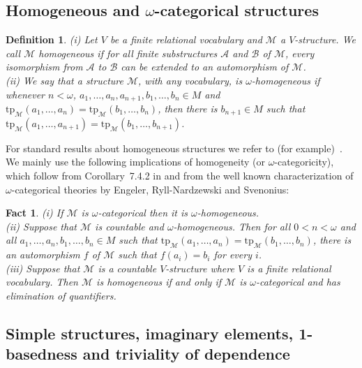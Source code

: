 \documentclass[11pt, twoside]{amsart}
\newtheorem{defin}[theor]{Definition}
\newtheorem{fact}[theor]{Fact}
\numberwithin{equation}{section}
\newcommand{\tp}{\mathrm{tp}}
\newcommand{\mcA}{\mathcal{A}}
\newcommand{\mcB}{\mathcal{B}}
\newcommand{\mcM}{\mathcal{M}}
\begin{document}
\subsection{Homogeneous and $\omega$-categorical structures}
\label{Homogeneous structures}

\begin{defin}\label{definition of homogeneous}{\rm
(i) Let $V$ be a finite relational vocabulary and $\mcM$ a $V$-structure. We call $\mcM$ {\em homogeneous}
if for all finite substructures $\mcA$ and $\mcB$ of $\mcM$, every isomorphism from $\mcA$ to $\mcB$ can be extended to an
automorphism of $\mcM$.\\
(ii) We say that a structure $\mcM$, with any vocabulary, is {\em $\omega$-homogeneous} 
if whenever $n < \omega$,
$a_1, \ldots, a_n, a_{n+1}, b_1, \ldots, b_n \in M$ and $\tp_\mcM(a_1, \ldots, a_n) = \tp_\mcM(b_1, \ldots, b_n)$,
then there is $b_{n+1} \in M$ such that $\tp_\mcM(a_1, \ldots, a_{n+1}) = \tp_\mcM(b_1, \ldots, b_{n+1})$.
}\end{defin}

\noindent
For standard results about homogeneous structures we refer to (for example)~\cite[Sections~7.1 and~7.4]{Hod}.
We mainly use the following implications of homogeneity
(or $\omega$-categoricity), which follow from Corollary~7.4.2 in \cite{Hod} and from
the well known characterization of $\omega$-categorical theories by Engeler, Ryll-Nardzewski and Svenonius:

\begin{fact}\label{fact about homogeneous structures}
(i) If $\mcM$ is $\omega$-categorical then it is $\omega$-homogeneous.\\
(ii) Suppose that $\mcM$ is countable and $\omega$-homogeneous.
Then for all $0 < n < \omega$ and all $a_1, \ldots, a_n, b_1, \ldots, b_n \in M$ such that 
$\tp_\mcM(a_1, \ldots, a_n) = \tp_\mcM(b_1, \ldots, b_n)$, there is an automorphism $f$ of $\mcM$ such that
$f(a_i) = b_i$ for every $i$.\\
(iii) Suppose that $\mcM$ is a countable $V$-structure where $V$ is a finite relational vocabulary.
Then $\mcM$ is homogeneous if and only if $\mcM$ is $\omega$-categorical and has elimination of quantifiers.
\end{fact}





\subsection{Simple structures, imaginary elements, 1-basedness and triviality of dependence}\label{Simple omega-categorical structures}
\end{document}
